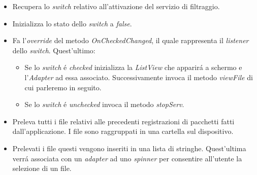 \documentclass[12pt]{article} %
\begin{document}
\begin{itemize}
\item Recupera lo \textit{switch} relativo all'attivazione del servizio di filtraggio.
\item Inizializza lo stato dello \textit{switch} a \textit{false}.
\item Fa l'\textit{override} del metodo \textit{OnCheckedChanged}, il quale rappresenta il \textit{listener} dello \textit{switch}. Quest'ultimo:
\begin{itemize}
\item Se lo \textit{switch} \'e \textit{checked} inizializza la \textit{ListView} che apparir\'a a schermo e l'\textit{Adapter} ad essa associato. Successivamente invoca il metodo \textit{viewFile} di cui parleremo in seguito.
\item Se lo \textit{switch} \'e \textit{unchecked} invoca il metodo \textit{stopServ}.
\end{itemize}
\item Preleva tutti i file relativi alle precedenti registrazioni di pacchetti fatti dall'applicazione. I file sono raggruppati in una cartella sul dispositivo.
\item Prelevati i file questi vengono inseriti in una lista di stringhe. Quest'ultima verr\'a associata con un \textit{adapter} ad uno \textit{spinner} per consentire all'utente la selezione di un file.
\end{itemize}










\end{document}
